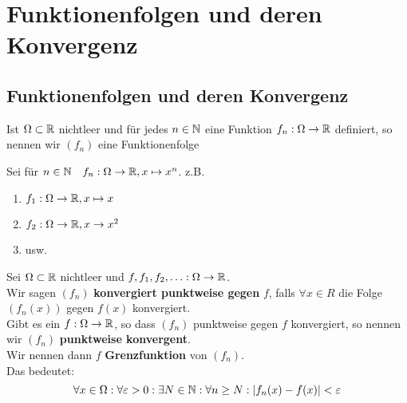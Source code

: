 \section{Funktionenfolgen und deren Konvergenz}
\subsection{Funktionenfolgen und deren Konvergenz}
Ist $ \Omega \subset \mathbb{R}  $ nichtleer und für jedes $ n \in \mathbb{N}  $ eine Funktion $ f_n : \Omega \to \mathbb{R}  $ definiert, so nennen wir $ (f_n) $ eine Funktionenfolge

\begin{subexample}
	Sei für $ n \in \mathbb{N} \quad f_n : \Omega \to \mathbb{R} , x \mapsto x^n $. z.B.
	\begin{enumerate}[label=\arabic*.]
		\item $ f_1: \Omega \to \mathbb{R} , x \mapsto x $ 
		\item $ f_2: \Omega \to \mathbb{R} , x \to x^2 $
		\item usw.
	\end{enumerate}
\end{subexample}

\begin{subdefinition}
	Sei $ \Omega \subset \mathbb{R}  $ nichtleer und $ f, f_1, f_2, \dotsc: \Omega \to \mathbb{R}  $.\\
	Wir sagen $ (f_n) $ \textbf{konvergiert punktweise gegen} $ f $, falls $ \forall x \in R $ die Folge $ (f_n(x)) $ gegen $ f(x) $ konvergiert.\\
	Gibt es ein $ f:\Omega\to \mathbb{R}  $, so dass $ (f_n) $ punktweise gegen $ f $ konvergiert, so nennen wir $ (f_n) $ \textbf{punktweise konvergent}.\\
	Wir nennen dann $ f $ \textbf{Grenzfunktion} von $ (f_n) $.\\
	Das bedeutet:
	\[
		\forall x \in \Omega: \forall \varepsilon > 0 : \exists N \in \mathbb{N} : \forall n \geq N: |f_n(x) - f(x) | < \varepsilon 
	\]
\end{subdefinition}

